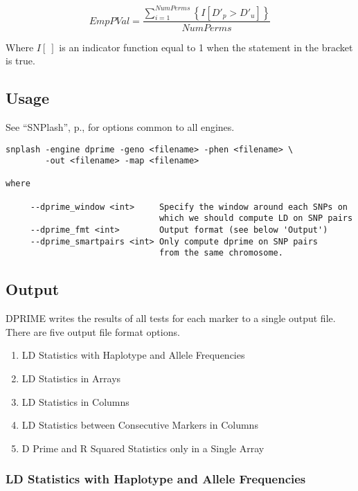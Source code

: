 \begin{equation*}
  EmpPVal = \frac{\displaystyle\sum_{i=1}^{NumPerms}\left\{ I\left[ D'_p>D'_u \right] \right\}}{NumPerms}
\end{equation*}

\noindent{}Where $I\left[ ~ \right]$ is an indicator function equal to 1 when
the statement in the bracket is true.


\subsection{Usage}
\label{subsub:dprime_usage}

See ``SNPlash'', p.\pageref{sec:snplash}, for options common to all engines.

\begin{verbatim}
snplash -engine dprime -geno <filename> -phen <filename> \
        -out <filename> -map <filename>

where

     --dprime_window <int>     Specify the window around each SNPs on 
                               which we should compute LD on SNP pairs  
     --dprime_fmt <int>        Output format (see below 'Output')
     --dprime_smartpairs <int> Only compute dprime on SNP pairs
                               from the same chromosome. 
\end{verbatim}

\subsection{Output}
DPRIME writes the results of all tests for each marker to a single output file.  There are five output file format options.  

\begin{enumerate}
\item LD Statistics with Haplotype and Allele Frequencies 
\item LD Statistics in Arrays 
\item LD Statistics in Columns 
\item LD Statistics between Consecutive Markers in Columns
\item D Prime and R Squared Statistics only in a Single Array
\end{enumerate}


\subsubsection{LD Statistics with Haplotype and Allele Frequencies}


